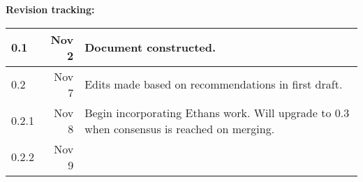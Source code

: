 \documentclass[12pt,a4paper]{article}
\begin{document}
\newpage
\textbf{Revision tracking:}\\
\begin{tabular}{|l|r|p{5.5in}|}
\hline
0.1 & Nov 2 & Document constructed.\\
\hline
0.2 & Nov 7 & Edits made based on recommendations in first draft.\\
\hline
0.2.1 & Nov 8 & Begin incorporating Ethans work. Will upgrade to 0.3 when consensus is reached on merging. \\
\hline
0.2.2 & Nov 9 & \\
\hline
\end{tabular}
\end{document}

